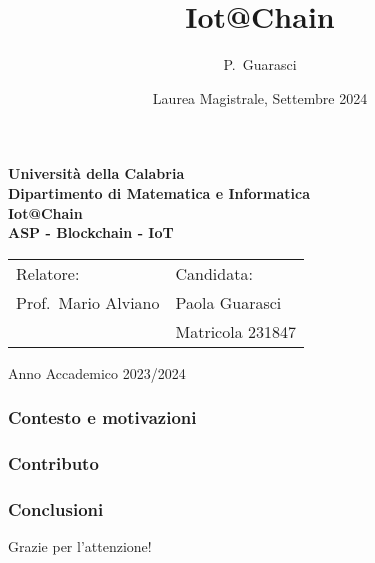 \documentclass{beamer}
\title[Iot@Chain] %
{Iot@Chain}
\author[Paola Guarasic] %
{P.~Guarasci\inst{1}}
\institute[Unical] %
{
  \inst{1}%
  Dipartimento di Matematica e Informatica\\
  Università della Calabria
}
\date[Laurea Magistrale 2024] %
{Laurea Magistrale, Settembre 2024}
\begin{document}

{
\begin{frame}[noframenumbering]
  \begin{center}
    \textbf{\LARGE Universit\`a della Calabria}\\
    \textbf{Dipartimento di Matematica e Informatica}\\
    \vskip 20pt
      { \huge \bfseries Iot@Chain\\[0.4cm]ASP - Blockchain - IoT}\\[0.2cm]
    \vskip 25pt

    \begin{tabular}{p{7cm}p{3cm}}
      Relatore:           & Candidata:       \\
      Prof.~Mario Alviano & Paola Guarasci   \\
                          & Matricola 231847 \\
    \end{tabular}

    \vskip 40pt
    \vskip 5pt
    Anno Accademico 2023/2024
    \vfill
  \end{center}
\end{frame}
}


\begin{frame}
  \frametitle{Contesto e motivazioni}
\end{frame}

\begin{frame}
  \frametitle{Contributo}
\end{frame}

\begin{frame}
  \frametitle{Conclusioni}
\end{frame}


{
\begin{frame}[noframenumbering]
  \begin{center}
    \vfill{\hfill}

    \centering
    \LARGE Grazie per l'attenzione!

    \vfill{\hfill}
  \end{center}
\end{frame}
}
\end{document}
